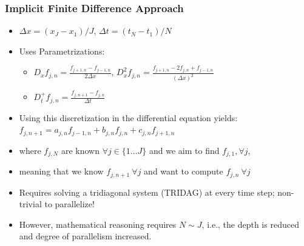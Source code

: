 \documentclass{beamer}
\newcommand{\emp}[1]{\textcolor{DikuRed}{ #1}}
\begin{document}
\begin{frame}[fragile,t]
  \frametitle{Implicit Finite Difference Approach}

\begin{itemize}
    \item $\Delta x = (x_{J}-x_{1})/J$, $\Delta t = (t_{N}-t_{1})/N$\smallskip
    \item Uses Parametrizations:
        \begin{itemize}
            \item $D_xf_{j,n} = \frac{f_{j+1,n}-f_{j-1,n}}{2\Delta x}$,
                  $D_x^2f_{j,n} = \frac{f_{j+1,n}-2f_{j,n}+f_{j-1,n}}{(\Delta x)^2}$
            \item \alert{$D_t^{+}f_{j,n} = \frac{f_{j,n+1} - f_{j,n}}{\Delta t}$}
        \end  {itemize}\smallskip
    \item Using this discretization in the differential equation yields:\\
             $f_{j,n+1} = a_{j,n}f_{j-1,n} + b_{j,n}f_{j,n} + c_{j,n}f_{j+1,n}$\smallskip
    \item where $f_{j,N}$ are known $\forall j \in \{1\ldots J\}$ and 
             we aim to find $f_{j,1}, \forall j$,\smallskip
    \item meaning that we know $f_{j,n+1}~\forall j$ and want to compute $f_{j,n}~\forall j$\smallskip
    \item \emp{Requires solving a tridiagonal system (TRIDAG) at every time step; non-trivial
            to parallelize!}

    \item \alert{However, mathematical reasoning requires $N \sim J$, i.e.,
            the depth is reduced and degree of parallelism increased.}
\end  {itemize}

\end{frame}
\end{document}
